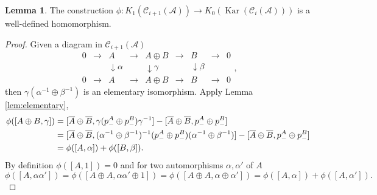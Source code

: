 \documentclass{article}
\theoremstyle{definition}
\newtheorem{lem}[theorem]{Lemma}
\newcommand{\CA}{{ \mathcal A}}
\begin{document}
\begin{lem}
    The construction $\phi: K_1(\mathcal{C}_{i+1}(\CA))\rightarrow K_0(\operatorname{Kar}(\mathcal{C}_{i}(\CA)))$ is a well-defined homomorphism. 
\end{lem}
\begin{proof}
    Given a diagram in $\mathcal{C}_{i+1}(\CA)$
        \[
\begin{array}{ccccccccc}
0 & \longrightarrow & A & \longrightarrow & A\oplus B & \longrightarrow & B & \longrightarrow & 0 \\
  &                 & \downarrow{\scriptstyle \alpha} 
  &                 & \downarrow{\scriptstyle \gamma} 
  &                 & \downarrow{\scriptstyle \beta} 
  &                 &   \\
0 & \longrightarrow & A & \longrightarrow & A \oplus B & \longrightarrow & B & \longrightarrow & 0
\end{array},
\]
then $\gamma  (\alpha^{-1}\oplus \beta^{-1})$ is an elementary isomorphism. Apply Lemma \ref{lem:elementary}, 
\begin{align}
    \phi([A\oplus B, \gamma])&=[\overline{A}\oplus \overline{B}, \gamma (p^A_-\oplus p^B_-)\gamma^{-1}]-[\overline{A}\oplus \overline{B},  p^A_-\oplus p^B_-] \notag\\
    &=[\overline{A}\oplus \overline{B},   (\alpha^{-1}\oplus \beta^{-1})^{-1} (p^A_-\oplus p^B_-) (\alpha^{-1}\oplus \beta^{-1})]-[\overline{A}\oplus \overline{B},  p^A_-\oplus p^B_-] \notag \\
    &=\phi([A, \alpha])+\phi([B, \beta]).
\end{align}
By definition $\phi([A, 1])=0$ and for two automorphisms $\alpha, \alpha'$ of $A$
$$\phi([A, \alpha\alpha'])=\phi([A\oplus A, \alpha\alpha'\oplus 1])=\phi([A\oplus A, \alpha\oplus \alpha'])= \phi([A, \alpha])+ \phi([A,\alpha']).$$
\end{proof}
\end{document}
